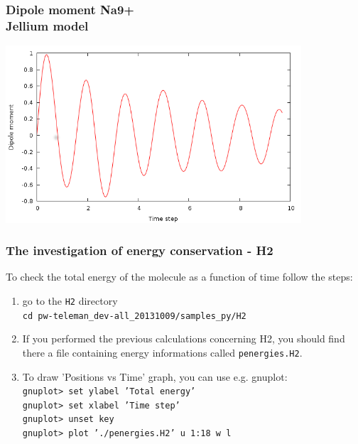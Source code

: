 \documentclass[10pt]{beamer}
\begin{document}
\begin{frame}
\frametitle{Dipole moment Na9+\\
Jellium model}

\centering
\includegraphics[width=11cm]{fig/dipolena9j} 

\end{frame}

\begin{frame}
\frametitle{The investigation of energy conservation - H2}

To check the total energy of the molecule as a function of time follow the steps:

\begin{enumerate}
\item go to the {\tt H2} directory\\
{\tt cd pw-teleman\_dev-all\_20131009/samples_py/H2}
\item If you performed the previous calculations concerning H2, you should find there a file containing energy informations called {\tt penergies.H2}. 
\item To draw   'Positions vs Time' graph, you can use e.g. gnuplot:\\
\vspace*{0.1cm}
{\tt gnuplot> set ylabel 'Total energy'}\\
{\tt gnuplot> set xlabel 'Time step'}\\
{\tt gnuplot> unset key}\\
{\tt gnuplot> plot './penergies.H2' u 1:18 w l}\\


\end{enumerate}


\end{frame}
\end{document}
